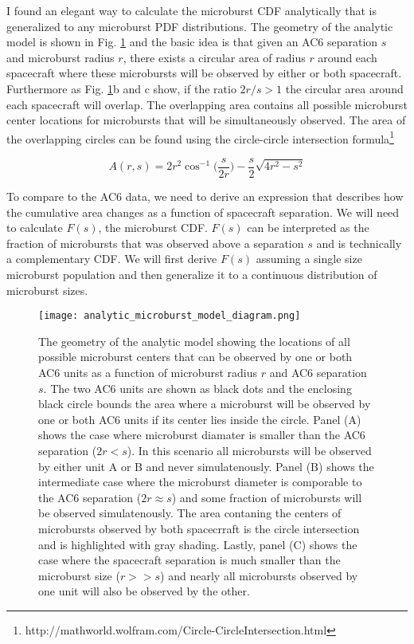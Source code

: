 \documentclass[12pt]{article}
\begin{document}
\maketitle

I found an elegant way to calculate the microburst CDF analytically that is generalized to any microburst PDF distributions. The geometry of the analytic model is shown in Fig. \ref{fig_diagram} and the basic idea is that given an AC6 separation $s$ and microburst radius $r$, there exists a circular area of radius $r$ around each spacecraft where these microbursts will be observed by either or both spacecraft. Furthermore as Fig. \ref{fig_diagram}b and c show, if the ratio $2r/s > 1$ the circular area around each spacecraft will overlap. The overlapping area contains all possible microburst center locations for microbursts that will be simultaneously observed. The area of the overlapping circles can be found using the circle-circle intersection formula\footnote{http://mathworld.wolfram.com/Circle-CircleIntersection.html}

\begin{equation}
A(r, s) = 2 r^2 \cos^{-1} \Bigg( \frac{s}{2r} \Bigg)- \frac{s}{2} \sqrt{4 r^2 - s^2}
\end{equation}

To compare to the AC6 data, we need to derive an expression that describes how the cumulative area changes as a function of spacecraft separation. We will need to calculate $F(s)$, the microburst CDF. $F(s)$ can be interpreted as the fraction of microbursts that was observed above a separation $s$ and is technically a complementary CDF. We will first derive $F(s)$ assuming a single size microburst population and then generalize it to a continuous distribution of microburst sizes.

\begin{figure}
\texttt{[image: analytic\_microburst\_model\_diagram.png]}
\caption{The geometry of the analytic model showing the locations of all possible microburst centers that can be observed by one or both AC6 units as a function of microburst radius $r$ and AC6 separation $s$. The two AC6 units are shown as black dots and the enclosing black circle bounds the area where a microburst will be observed by one or both AC6 units if its center lies inside the circle. Panel (A) shows the case where microburst diamater is smaller than the AC6 separation ($2r < s$). In this scenario all microbursts will be observed by either unit A or B and never simulatenously. Panel (B) shows the intermediate case where the microburst diameter is comporable to the AC6 separation ($2r \approx s$) and some fraction of microbursts will be observed simulatenously. The area contaning the centers of microbursts observed by both spacecrraft is the circle intersection and is highlighted with gray shading. Lastly, panel (C) shows the case where the spacecraft separation is much smaller than the microburst size ($r >> s$) and nearly all microbursts observed by one unit will also be observed by the other.} \label{fig_diagram}
\end{figure}
\end{document}
